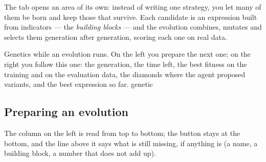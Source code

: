 The  tab opens an area of its own: instead of writing one
strategy, you let many of them be born and keep those that survive. Each
candidate is an expression built from indicators --- the \emph{building
blocks} --- and the evolution combines, mutates and selects them generation
after generation, scoring each one on real data.

  {Genetics while an evolution runs. On the left you prepare the next one;
   on the right you follow this one: the generation, the time left, the best
   fitness on the training and on the evaluation data, the diamonds where
   the agent proposed variants, and the best expression so far.}
  {genetic}

\subsection{Preparing an evolution}

The column on the left is read from top to bottom; the
 button stays at the bottom, and the line above it
says what is still missing, if anything is (a name, a building block, a
number that does not add up).

